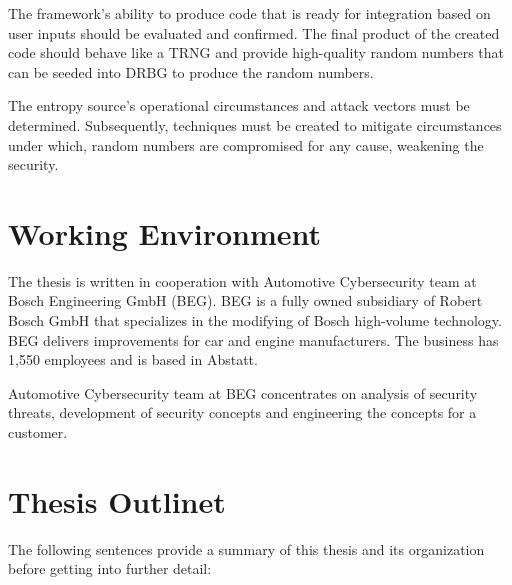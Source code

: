 The framework's ability to produce code that is ready for integration based on user inputs should be evaluated and confirmed. The final product of the created code should behave like a TRNG and provide high-quality random numbers that can be seeded into DRBG to produce the random numbers.

The entropy source’s operational circumstances and attack vectors must be determined. Subsequently, techniques must be created to mitigate circumstances under which, random numbers are compromised for any cause, weakening the security.

%
%
\section{Working Environment}
\label{sec:intro:Working Environment}

The thesis is written in cooperation with Automotive Cybersecurity team at Bosch Engineering GmbH (BEG). BEG is a fully owned subsidiary of Robert Bosch GmbH that specializes in the modifying of Bosch high-volume technology. BEG delivers improvements for car and engine manufacturers. The business has 1,550 employees and is based in Abstatt.

Automotive Cybersecurity team at BEG concentrates on analysis of security threats,  development of security concepts and engineering the concepts for a customer. 

%
%
\section{Thesis Outlinet}
\label{sec:intro:Thesis Outline}

The following sentences provide a summary of this thesis and its organization before getting into further detail:

